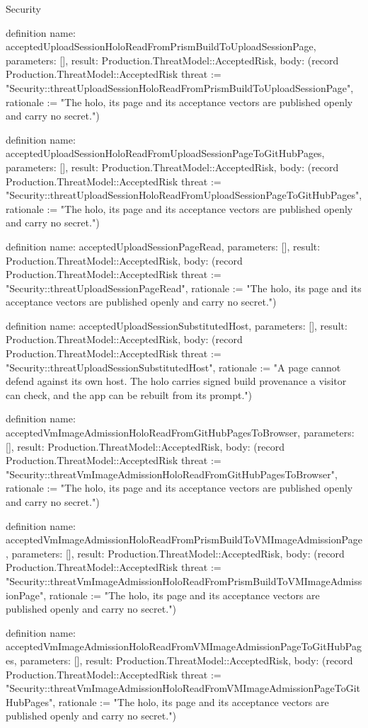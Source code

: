 \begin{lexlean}{Security}
\begin{semanticmodule}
definition{
  name: acceptedUploadSessionHoloReadFromPrismBuildToUploadSessionPage,
  parameters: [],
  result: Production.ThreatModel::AcceptedRisk,
  body: (record Production.ThreatModel::AcceptedRisk {threat := "Security::threatUploadSessionHoloReadFromPrismBuildToUploadSessionPage", rationale := "The holo, its page and its acceptance vectors are published openly and carry no secret."})
}

definition{
  name: acceptedUploadSessionHoloReadFromUploadSessionPageToGitHubPages,
  parameters: [],
  result: Production.ThreatModel::AcceptedRisk,
  body: (record Production.ThreatModel::AcceptedRisk {threat := "Security::threatUploadSessionHoloReadFromUploadSessionPageToGitHubPages", rationale := "The holo, its page and its acceptance vectors are published openly and carry no secret."})
}

definition{
  name: acceptedUploadSessionPageRead,
  parameters: [],
  result: Production.ThreatModel::AcceptedRisk,
  body: (record Production.ThreatModel::AcceptedRisk {threat := "Security::threatUploadSessionPageRead", rationale := "The holo, its page and its acceptance vectors are published openly and carry no secret."})
}

definition{
  name: acceptedUploadSessionSubstitutedHost,
  parameters: [],
  result: Production.ThreatModel::AcceptedRisk,
  body: (record Production.ThreatModel::AcceptedRisk {threat := "Security::threatUploadSessionSubstitutedHost", rationale := "A page cannot defend against its own host. The holo carries signed build provenance a visitor can check, and the app can be rebuilt from its prompt."})
}

definition{
  name: acceptedVmImageAdmissionHoloReadFromGitHubPagesToBrowser,
  parameters: [],
  result: Production.ThreatModel::AcceptedRisk,
  body: (record Production.ThreatModel::AcceptedRisk {threat := "Security::threatVmImageAdmissionHoloReadFromGitHubPagesToBrowser", rationale := "The holo, its page and its acceptance vectors are published openly and carry no secret."})
}

definition{
  name: acceptedVmImageAdmissionHoloReadFromPrismBuildToVMImageAdmissionPage,
  parameters: [],
  result: Production.ThreatModel::AcceptedRisk,
  body: (record Production.ThreatModel::AcceptedRisk {threat := "Security::threatVmImageAdmissionHoloReadFromPrismBuildToVMImageAdmissionPage", rationale := "The holo, its page and its acceptance vectors are published openly and carry no secret."})
}

definition{
  name: acceptedVmImageAdmissionHoloReadFromVMImageAdmissionPageToGitHubPages,
  parameters: [],
  result: Production.ThreatModel::AcceptedRisk,
  body: (record Production.ThreatModel::AcceptedRisk {threat := "Security::threatVmImageAdmissionHoloReadFromVMImageAdmissionPageToGitHubPages", rationale := "The holo, its page and its acceptance vectors are published openly and carry no secret."})
}


\end{semanticmodule}
\end{lexlean}
